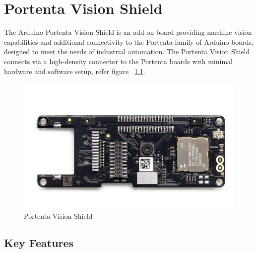 %
%

\chapter{Portenta Vision Shield}


The Arduino Portenta Vision Shield is an add-on board providing machine vision capabilities and additional
connectivity to the Portenta family of Arduino boards, designed to meet the needs of industrial automation. The
Portenta Vision Shield connects via a high-density connector to the Portenta boards with minimal hardware and software setup, refer figure ~\ref{VisionShield1}. \cite{arduinoVisionShield:2024}

\begin{figure}
	\begin{center}
		\includegraphics[width=0.7\linewidth]{Images/VisionShield/VisionShield.png}
		\caption{Portenta Vision Shield}
		\label{VisionShield1}
	\end{center}
\end{figure}



\section{Key Features}

